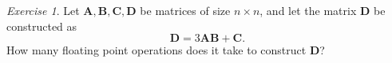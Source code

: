 \documentclass[onecolumn, oneside, a4paper, 11pt]{memoir}
\theoremstyle{remark}
\newtheorem{ex}{Exercise}
\newtheorem*{sol}{Solution}
\begin{document}

\begin{ex}
  Let $\bm A, \bm B, \bm C, \bm D$ be matrices of size $n \times n$, and let the
  matrix $\bm D$ be constructed as
  \[
    \bm D = 3 \bm A \bm B + \bm C.
  \]
  How many floating point operations does it take to construct $\bm D$?
\end{ex}

\end{document}
